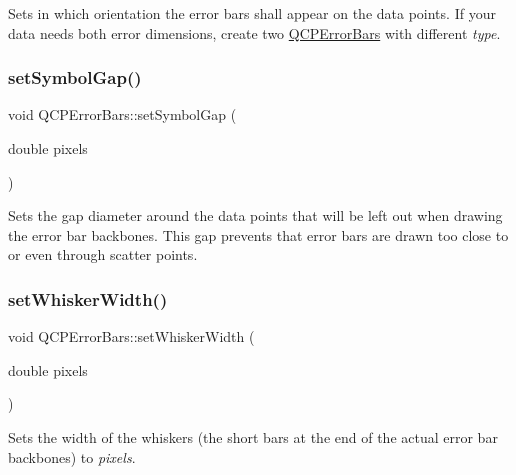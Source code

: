 Sets in which orientation the error bars shall appear on the data points. If your data needs both error dimensions, create two \hyperlink{class_q_c_p_error_bars}{Q\+C\+P\+Error\+Bars} with different {\itshape type}. \mbox{\label{class_q_c_p_error_bars_a280ee8d863d8a2630c309701d019b3de}} 
\subsubsection{\texorpdfstring{set\+Symbol\+Gap()}{setSymbolGap()}}
{\footnotesize\ttfamily void Q\+C\+P\+Error\+Bars\+::set\+Symbol\+Gap (\begin{DoxyParamCaption}\item[{double}]{pixels }\end{DoxyParamCaption})}

Sets the gap diameter around the data points that will be left out when drawing the error bar backbones. This gap prevents that error bars are drawn too close to or even through scatter points. \mbox{\label{class_q_c_p_error_bars_ad05f6ff9e46c6047f1cd2459744b7b59}} 
\subsubsection{\texorpdfstring{set\+Whisker\+Width()}{setWhiskerWidth()}}
{\footnotesize\ttfamily void Q\+C\+P\+Error\+Bars\+::set\+Whisker\+Width (\begin{DoxyParamCaption}\item[{double}]{pixels }\end{DoxyParamCaption})}

Sets the width of the whiskers (the short bars at the end of the actual error bar backbones) to {\itshape pixels}. \mbox{\label{class_q_c_p_error_bars_aa00fcef7b0cb5c54bafe32ab4b16e674}} 

